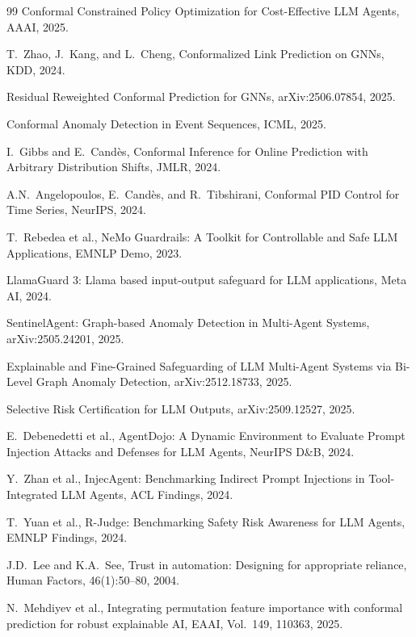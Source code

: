 \documentclass[preprint,review,12pt]{elsarticle}
\begin{document}
\begin{thebibliography}{99}
 Conformal Constrained Policy Optimization for Cost-Effective LLM Agents, AAAI, 2025.

 T.~Zhao, J.~Kang, and L.~Cheng, Conformalized Link Prediction on GNNs, KDD, 2024.

 Residual Reweighted Conformal Prediction for GNNs, arXiv:2506.07854, 2025.

 Conformal Anomaly Detection in Event Sequences, ICML, 2025.

 I.~Gibbs and E.~Cand\`{e}s, Conformal Inference for Online Prediction with Arbitrary Distribution Shifts, JMLR, 2024.

 A.N.~Angelopoulos, E.~Cand\`{e}s, and R.~Tibshirani, Conformal PID Control for Time Series, NeurIPS, 2024.

 T.~Rebedea et al., NeMo Guardrails: A Toolkit for Controllable and Safe LLM Applications, EMNLP Demo, 2023.

 LlamaGuard 3: Llama based input-output safeguard for LLM applications, Meta AI, 2024.

 SentinelAgent: Graph-based Anomaly Detection in Multi-Agent Systems, arXiv:2505.24201, 2025.

 Explainable and Fine-Grained Safeguarding of LLM Multi-Agent Systems via Bi-Level Graph Anomaly Detection, arXiv:2512.18733, 2025.

 Selective Risk Certification for LLM Outputs, arXiv:2509.12527, 2025.

 E.~Debenedetti et al., AgentDojo: A Dynamic Environment to Evaluate Prompt Injection Attacks and Defenses for LLM Agents, NeurIPS D\&B, 2024.

 Y.~Zhan et al., InjecAgent: Benchmarking Indirect Prompt Injections in Tool-Integrated LLM Agents, ACL Findings, 2024.

 T.~Yuan et al., R-Judge: Benchmarking Safety Risk Awareness for LLM Agents, EMNLP Findings, 2024.

 J.D.~Lee and K.A.~See, Trust in automation: Designing for appropriate reliance, Human Factors, 46(1):50--80, 2004.

 N.~Mehdiyev et al., Integrating permutation feature importance with conformal prediction for robust explainable AI, EAAI, Vol.~149, 110363, 2025.

\end{thebibliography}
\end{document}
